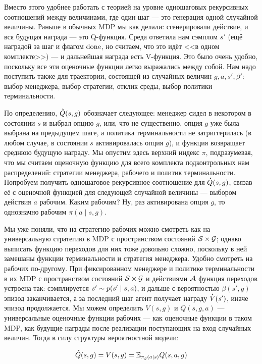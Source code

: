 Вместо этого удобнее работать с теорией на уровне одношаговых рекурсивных соотношений между величинами, где один шаг --- это генерация одной случайной величины. Раньше в обычных MDP мы как делали: сгенерировали действие, и вся будущая награда --- это Q-функция. Среда ответила нам сэмплом $s'$ (ещё наградой за шаг и флагом $\mathrm{done}$, но считаем, что это идёт <<в одном комплекте>>) --- и дальнейшая награда есть V-функция. Это было очень удобно, поскольку все эти оценочные функции легко выражались между собой. Нам надо поступить также для траектории, состоящей из случайных величин $g, a, s', \beta'$: выбор менеджера, выбор стратегии, отклик среды, выбор политики терминальности.

По определению, $\accentset{\star}{Q}(s, g)$ обозначает следующее: менеджер сидел в некотором в состоянии $s$ и выбрал опцию $g$, или, что не существенно, опция $g$ уже была выбрана на предыдущем шаге, а политика терминальности не затриггерилась (в любом случае, в состоянии $s$ активировалась опция $g$), и функция возвращает среднюю будущую награду. Мы опустим здесь верхний индекс $\pi$, подразумевая, что мы считаем оценочную функцию для всего комплекта подконтрольных нам распределений: стратегии менеджера, рабочего и политик терминальности. Попробуем получить одношаговое рекурсивное соотношение для $\accentset{\star}{Q}(s, g)$, связав её с оценочной функцией для следующей случайной величины --- выбором действия $a$ рабочим. Каким рабочим? Ну, раз активирована опция $g$, то однозначно рабочим $\pi(a \mid s, g)$. 

Мы уже поняли, что на стратегию рабочих можно смотреть как на универсальную стратегию в MDP с пространством состояний $\mathcal{S} \times \mathcal{G}$; однако выписать функцию переходов для них тоже довольно сложно, поскольку в ней замешаны функции терминальности и стратегия менеджера. Удобно смотреть на рабочих по-другому. При фиксированном менеджере и политике терминальности в их MDP с пространством состояний $\mathcal{S} \times \mathcal{G}$ и действиями $\mathcal{A}$ функция переходов устроена так: сэмплируется $s' \HM\sim p(s' \HM\mid s, a)$, и дальше с вероятностью $\beta(s', g)$ эпизод заканчивается, а за последний шаг агент получает награду $\accentset{\star}{V}(s')$, иначе эпизод продолжается. Мы можем определить $V(s, g)$ и $Q(s, g, a)$ --- универсальные оценочные функции рабочих --- как оценочные функции в таком MDP, как будущие награды после реализации поступающих на вход случайных величин. Тогда в силу структуры вероятностной модели:
\begin{proposition}
$$\accentset{\star}{Q}(s, g) = V(s, g) = \mathbb{E}_{\pi_g(a \mid s)} Q(s, a, g)$$
\end{proposition}

